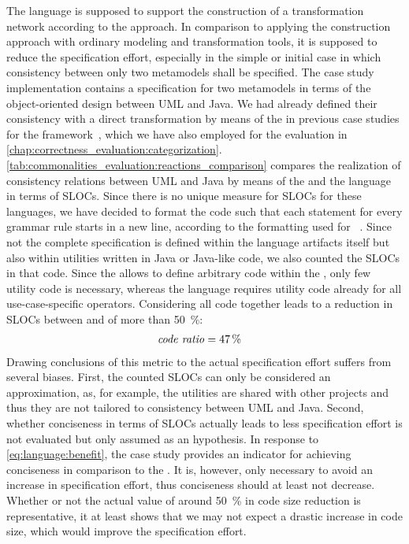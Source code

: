 The \commonalities language is supposed to support the construction of a transformation network according to the \commonalities approach.
In comparison to applying the construction approach with ordinary modeling and transformation tools, it is supposed to reduce the specification effort, especially in the simple or initial case in which consistency between only two metamodels shall be specified.
The case study implementation contains a specification for two metamodels in terms of the object-oriented design \commonalities between \gls{UML} and Java.
We had already defined their consistency with a direct transformation by means of the \reactionslanguage in previous case studies for the \vitruv framework~, which we have also employed for the evaluation in \autoref{chap:correctness_evaluation:categorization}.
\autoref{tab:commonalities_evaluation:reactions_comparison} compares the realization of consistency relations between \gls{UML} and Java by means of the \reactionslanguage and the \commonalities language in terms of \glspl{SLOC}.
Since there is no unique measure for \glspl{SLOC} for these languages, we have decided to format the code such that each statement for every grammar rule starts in a new line, according to the formatting used for \reactions~.
Since not the complete specification is defined within the language artifacts itself but also within utilities written in Java or Java-like code, we also counted the \glspl{SLOC} in that code.
Since the \reactionslanguage allows to define arbitrary code within the \reactions, only few utility code is necessary, whereas the \commonalities language requires utility code already for all use-case-specific operators.
Considering all code together leads to a reduction in \glspl{SLOC} between \reactions and \commonalities of more than \SI{50}{\percent}:
\begin{align*}
    &
    \mathit{code\ ratio} = \SI{47}{\percent}
\end{align*}
Drawing conclusions of this metric to the actual specification effort suffers from several biases.
First, the counted \glspl{SLOC} can only be considered an approximation, as, for example, the utilities are shared with other projects and thus they are not tailored to consistency between \gls{UML} and Java.
Second, whether conciseness in terms of \glspl{SLOC} actually leads to less specification effort is not evaluated but only assumed as an hypothesis.
In response to \autoref{eq:language:benefit}, the case study provides an indicator for achieving conciseness in comparison to the \reactionslanguage.
It is, however, only necessary to avoid an increase in specification effort, thus conciseness should at least not decrease.
Whether or not the actual value of around \SI{50}{\percent} in code size reduction is representative, it at least shows that we may not expect a drastic increase in code size, which would improve the specification effort.



